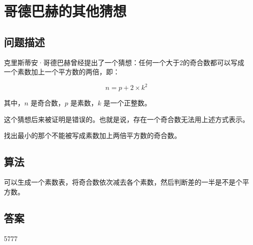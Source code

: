 \section{哥德巴赫的其他猜想}\label{sec:problem46}
\subsection{问题描述}
\begin{tcolorbox}
克里斯蒂安·哥德巴赫曾经提出了一个猜想：任何一个大于2的奇合数都可以写成一个素数加上一个平方数的两倍，即：

\[
n = p + 2 \times k^2
\]

其中，\( n \) 是奇合数，\( p \) 是素数，\( k \) 是一个正整数。

这个猜想后来被证明是错误的。也就是说，存在一个奇合数无法用上述方式表示。

找出最小的那个不能被写成素数加上两倍平方数的奇合数。
\end{tcolorbox}

\subsection{算法}
可以生成一个素数表，将奇合数依次减去各个素数，然后判断差的一半是不是个平方数。

\subsection{答案}
5777
